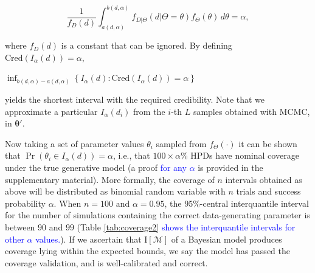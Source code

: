 \documentclass[oneside]{article}
\begin{document}
\begin{equation*}
  \frac{1}{f_D(d)} \int_{a(d, \alpha)}^{b(d,\alpha)} f_{D|\Theta}(d | \Theta=\theta)f_\Theta(\theta)\, d\theta = \alpha,
\end{equation*}

\noindent where
$f_D(d)$
is a constant that can be ignored.
By defining $\text{Cred}(I_\alpha(d)) = \alpha$,

\begin{center}
  \hspace{0cm}
  $\inf_{b(d, \alpha)-a(d, \alpha)} \left \{ I_\alpha(d) : \text{Cred}(I_\alpha(d)) = \alpha \right\}$
\end{center}

\noindent yields the shortest interval with the required credibility.
Note that we approximate a particular $I_\alpha(d_i)$ from the $i$-th $L$ samples obtained with MCMC, in $\boldsymbol{\theta}'$.

Now taking a set of parameter values $\theta_i$ sampled from $f_\Theta(\cdot)$
it can be shown that
$\operatorname{Pr}\left(\theta_i \in I_\alpha(d) \right) = \alpha$, i.e., that $100\times\alpha$\% HPDs have nominal coverage under the true generative model (a proof \textcolor{blue}{for any $\alpha$} is provided in the supplementary material).
More formally, the coverage of $n$ intervals obtained as above will be distributed as binomial random variable with $n$ trials and success probability $\alpha$.
When $n=100$ and $\alpha = 0.95$, the 95\%-central interquantile interval for the number of simulations containing the correct data-generating parameter is between $90$ and $99$ (Table \ref{tab:coverage2} \textcolor{blue}{shows the interquantile intervals for other $\alpha$ values.}).
If we ascertain that $\text{I}[\mathcal{M}]$ of a Bayesian model produces coverage lying within the expected bounds, we say the model has passed the coverage validation, and is well-calibrated and correct.
\end{document}

